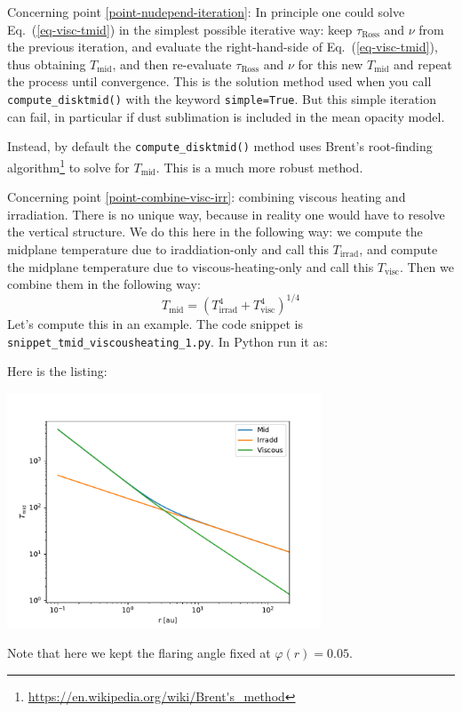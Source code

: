 \documentclass{book}
\newcommand{\code}[1]{{\small\tt #1}}
\begin{document}
Concerning point \ref{point-nudepend-iteration}: In principle one could solve
Eq.~(\ref{eq-visc-tmid}) in the simplest possible iterative way: keep
$\tau_{\mathrm{Ross}}$ and $\nu$ from the previous iteration, and evaluate
the right-hand-side of Eq.~(\ref{eq-visc-tmid}), thus obtaining
$T_{\mathrm{mid}}$, and then re-evaluate $\tau_{\mathrm{Ross}}$ and $\nu$
for this new $T_{\mathrm{mid}}$ and repeat the process until convergence.
This is the solution method used when you call \code{compute\_disktmid()}
with the keyword \code{simple=True}. But this simple iteration can fail,
in particular if dust sublimation is included in the mean opacity model.

Instead, by default the \code{compute\_disktmid()} method uses Brent's
root-finding
algorithm\footnote{\url{https://en.wikipedia.org/wiki/Brent's_method}}
to solve for $T_{\mathrm{mid}}$. This is a much more robust method.

Concerning point \ref{point-combine-visc-irr}: combining viscous heating and irradiation.
There is no unique way, because in reality one would have to resolve the
vertical structure. We do this here in the following way: we compute
the midplane temperature due to iraddiation-only and call this $T_{\mathrm{irrad}}$,
and compute the midplane temperature due to viscous-heating-only and call
this $T_{\mathrm{visc}}$. Then we combine them in the following way:
\begin{equation}
T_{\mathrm{mid}} = \left(T_{\mathrm{irrad}}^4 + T_{\mathrm{visc}}^4 \right)^{1/4}
\end{equation}
Let's compute this in an example. The code snippet is
\code{snippet\_tmid\_viscousheating\_1.py}. In Python run it as:
\begin{codebox}
\end{codebox}
Here is the listing:

\centerline{\includegraphics[width=0.7\textwidth]{../snippets/fig_snippet_tmid_viscousheating_1_1.pdf}}
Note that here we kept the flaring angle fixed at $\varphi(r)=0.05$.
\end{document}
